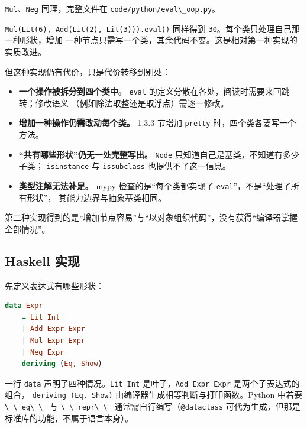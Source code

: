 \passthrough{\lstinline!Mul!}、\passthrough{\lstinline!Neg!} 同理，完整文件在 \passthrough{\lstinline!code/python/eval\_oop.py!}。

\passthrough{\lstinline!Mul(Lit(6), Add(Lit(2), Lit(3))).eval()!} 同样得到 \passthrough{\lstinline!30!}。每个类只处理自己那一种形状，增加
一种节点只需写一个类，其余代码不变。这是相对第一种实现的实质改进。

但这种实现仍有代价，只是代价转移到别处：

\begin{itemize}
\tightlist
\item
  \textbf{一个操作被拆分到四个类中。} \passthrough{\lstinline!eval!} 的定义分散在各处，阅读时需要来回跳转；修改语义
  （例如除法取整还是取浮点）需逐一修改。
\item
  \textbf{增加一种操作仍需改动每个类。} 1.3.3 节增加 \passthrough{\lstinline!pretty!} 时，四个类各要写一个方法。
\item
  \textbf{“共有哪些形状”仍无一处完整写出。} \passthrough{\lstinline!Node!} 只知道自己是基类，不知道有多少子类；
  \passthrough{\lstinline!isinstance!} 与 \passthrough{\lstinline!issubclass!} 也提供不了这一信息。
\item
  \textbf{类型注解无法补足。} mypy 检查的是“每个类都实现了 \passthrough{\lstinline!eval!}”，不是“处理了所有形状”，
  其能力边界与抽象基类相同。
\end{itemize}

第二种实现得到的是“增加节点容易”与“以对象组织代码”，没有获得“编译器掌握全部情况”。

\subsection{Haskell 实现}\label{haskell-ux5b9eux73b0}

先定义表达式有哪些形状：

\begin{lstlisting}[language=Haskell]
data Expr
    = Lit Int
    | Add Expr Expr
    | Mul Expr Expr
    | Neg Expr
    deriving (Eq, Show)
\end{lstlisting}

一行 \passthrough{\lstinline!data!} 声明了四种情况。\passthrough{\lstinline!Lit Int!} 是叶子，\passthrough{\lstinline!Add Expr Expr!} 是两个子表达式的组合，
\passthrough{\lstinline!deriving (Eq, Show)!} 由编译器生成相等判断与打印函数。Python 中若要 \passthrough{\lstinline!\_\_eq\_\_!} 与 \passthrough{\lstinline!\_\_repr\_\_!}
通常需自行编写（\passthrough{\lstinline!@dataclass!} 可代为生成，但那是标准库的功能，不属于语言本身）。

